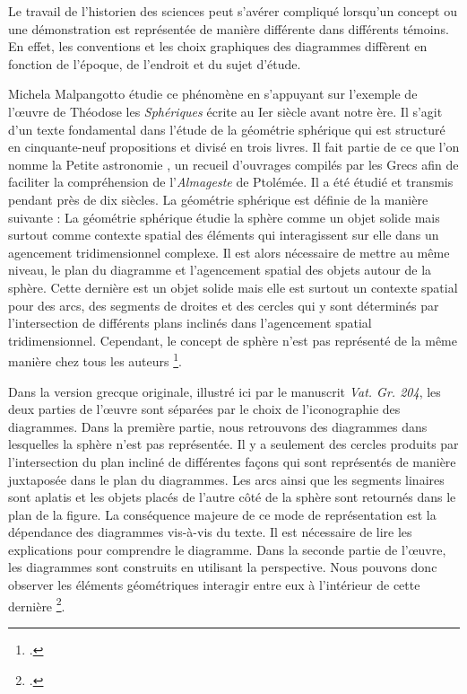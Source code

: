 Le travail de l'historien des sciences peut s'avérer compliqué lorsqu'un concept ou une démonstration est représentée de manière différente dans différents témoins. En effet, les conventions et les choix graphiques des diagrammes diffèrent en fonction de l'époque, de l'endroit et du sujet d'étude.

Michela Malpangotto étudie ce phénomène en s'appuyant sur l'exemple de l'œuvre de Théodose les \textit{Sphériques} écrite au Ier siècle avant notre ère. Il s'agit d'un texte fondamental dans l'étude de la géométrie sphérique qui est structuré en cinquante-neuf propositions et divisé en trois livres. Il fait partie de ce que l'on nomme la \og Petite astronomie \fg, un recueil d'ouvrages compilés par les Grecs afin de faciliter la compréhension de l'\textit{Almageste} de Ptolémée. Il a été étudié et transmis pendant près de dix siècles. La géométrie sphérique est définie de la manière suivante : \og La géométrie sphérique étudie la sphère comme un objet solide mais surtout comme contexte spatial des éléments qui interagissent sur elle dans un agencement tridimensionnel complexe. \fg Il est alors nécessaire de mettre au même niveau, le plan du diagramme et l'agencement spatial des objets autour de la sphère. Cette dernière est un objet solide mais elle est surtout un contexte spatial pour des arcs, des segments de droites et des cercles qui y sont déterminés par l'intersection de différents plans inclinés dans l'agencement spatial tridimensionnel. Cependant, le concept de sphère n'est pas représenté de la même manière chez tous les auteurs \footcite{malpangottoGraphicalChoicesGeometrical2010}. 

Dans la version grecque originale, illustré ici par le manuscrit \textit{Vat. Gr. 204}, les deux parties de l'œuvre sont séparées par le choix de l'iconographie des diagrammes. Dans la première partie, nous retrouvons des diagrammes dans lesquelles la sphère n'est pas représentée. Il y a seulement des cercles produits par l'intersection du plan incliné de différentes façons qui sont représentés de manière juxtaposée dans le plan du diagrammes. Les arcs ainsi que les segments linaires sont aplatis et les objets placés de l'autre côté de la sphère sont retournés dans le plan de la figure. La conséquence majeure de ce mode de représentation est la dépendance des diagrammes vis-à-vis du texte. Il est nécessaire de lire les explications pour comprendre le diagramme. Dans la seconde partie de l'œuvre, les diagrammes sont construits en utilisant la perspective. Nous pouvons donc observer les éléments géométriques interagir entre eux à l'intérieur de cette dernière \footcite{malpangottoGraphicalChoicesGeometrical2010}.  

